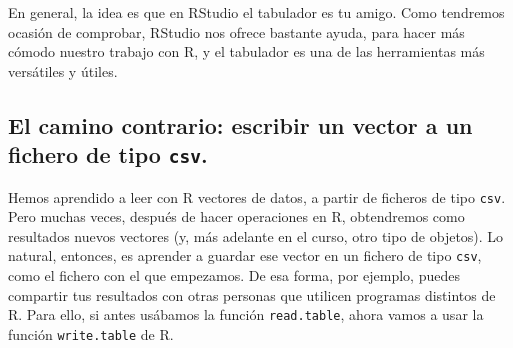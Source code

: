\documentclass[10pt,a4paper]{article}\usepackage[]{graphicx}\usepackage[]{color}
\newcounter {cont01}
\begin{document}

En general, la idea es que en RStudio el tabulador es tu amigo. Como tendremos ocasión de comprobar, RStudio nos ofrece bastante ayuda, para hacer más cómodo nuestro trabajo con R, y el tabulador es una de las herramientas más versátiles y útiles.

\subsection{El camino contrario:  escribir un vector a un fichero de tipo {\tt csv}.}


Hemos aprendido a leer con R vectores de datos, a partir de ficheros de tipo {\tt csv}. Pero muchas veces, después de hacer operaciones en R, obtendremos como resultados nuevos vectores (y, más adelante en el curso, otro tipo de objetos). Lo natural, entonces,  es aprender a guardar ese vector en un fichero de tipo {\tt csv}, como el fichero con el que empezamos. De esa forma, por ejemplo, puedes compartir tus resultados con otras personas que utilicen programas distintos de R.  Para ello, si antes usábamos la función {\tt read.table}, ahora vamos a usar la función {\tt write.table} de R.\\
\end{document}
